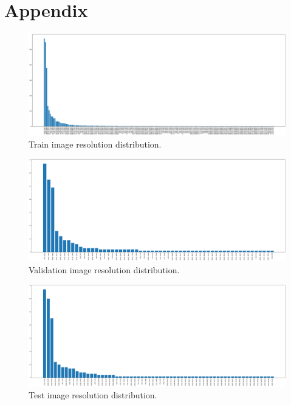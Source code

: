 \section{Appendix}
\label{sec:appendix}

\begin{figure}[htb!]
  \centering
  \includegraphics[width=\textwidth]{assets/train_image_resolutions.pdf}
  \caption{Train image resolution distribution.}
  \label{figure:1}
\end{figure}

\begin{figure}[htb!]
  \centering
  \includegraphics[width=\textwidth]{assets/valid_image_resolutions.pdf}
  \caption{Validation image resolution distribution.}
  \label{figure:2}
\end{figure}

\begin{figure}[htb!]
  \centering
  \includegraphics[width=\textwidth]{assets/test_image_resolutions.pdf}
  \caption{Test image resolution distribution.}
  \label{figure:3}
\end{figure}



